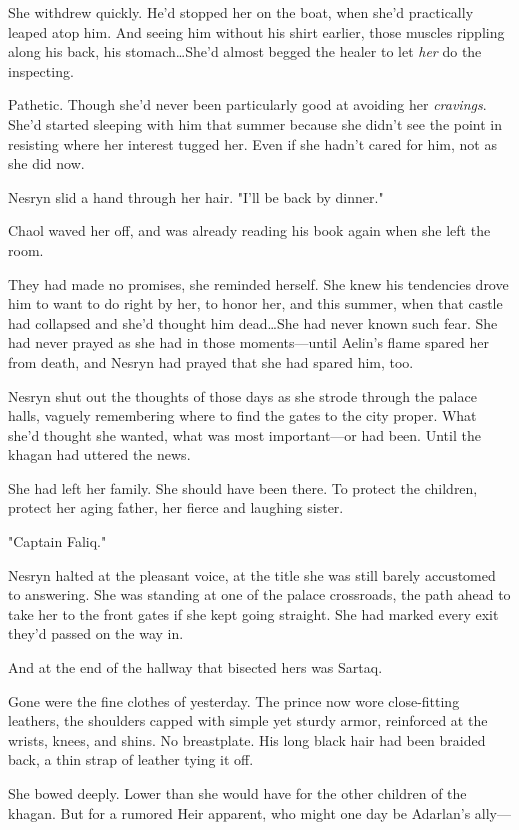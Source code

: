 She withdrew quickly.
He'd stopped her on the boat, when she'd practically leaped atop him.
And seeing him without his shirt earlier, those muscles rippling along his back, his stomach\ldots She'd almost begged the healer to let \emph{her} do the inspecting.

Pathetic.
Though she'd never been particularly good at avoiding her \emph{cravings}.
She'd started sleeping with him that summer because she didn't see the point in resisting where her interest tugged her.
Even if she hadn't cared for him, not as she did now.

Nesryn slid a hand through her hair.
"I'll be back by dinner."

Chaol waved her off, and was already reading his book again when she left the room.

They had made no promises, she reminded herself.
She knew his tendencies drove him to want to do right by her, to honor her, and this summer, when that castle had collapsed and she'd thought him dead\ldots She had never known such fear.
She had never prayed as she had in those moments---until Aelin's flame spared her from death, and Nesryn had prayed that she had spared him, too.

Nesryn shut out the thoughts of those days as she strode through the palace halls, vaguely remembering where to find the gates to the city proper.
What she'd thought she wanted, what was most important---or had been.
Until the khagan had uttered the news.

She had left her family.
She should have been there.
To protect the children, protect her aging father, her fierce and laughing sister.

"Captain Faliq."

Nesryn halted at the pleasant voice, at the title she was still barely accustomed to answering.
She was standing at one of the palace crossroads, the path ahead to take her to the front gates if she kept going straight.
She had marked every exit they'd passed on the way in.

And at the end of the hallway that bisected hers was Sartaq.

Gone were the fine clothes of yesterday.
The prince now wore close-fitting leathers, the shoulders capped with simple yet sturdy armor, reinforced at the wrists, knees, and shins.
No breastplate.
His long black hair had been braided back, a thin strap of leather tying it off.

She bowed deeply.
Lower than she would have for the other children of the khagan.
But for a rumored Heir apparent, who might one day be Adarlan's ally---

